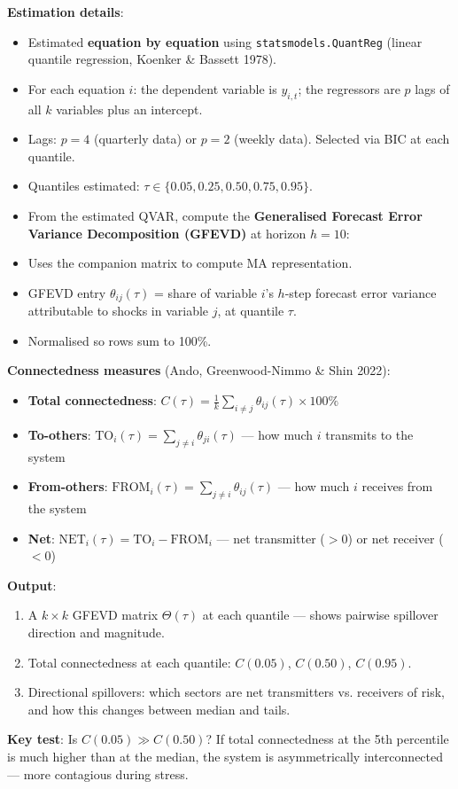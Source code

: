 \documentclass[11pt,a4paper]{article}
\begin{document}
\textbf{Estimation details}:
\begin{itemize}
\item Estimated \textbf{equation by equation} using \texttt{statsmodels.QuantReg} (linear quantile regression, Koenker \& Bassett 1978).
\item For each equation $i$: the dependent variable is $y_{i,t}$; the regressors are $p$ lags of all $k$ variables plus an intercept.
\item Lags: $p = 4$ (quarterly data) or $p = 2$ (weekly data). Selected via BIC at each quantile.
\item Quantiles estimated: $\tau \in \{0.05, 0.25, 0.50, 0.75, 0.95\}$.
\item From the estimated QVAR, compute the \textbf{Generalised Forecast Error Variance Decomposition (GFEVD)} at horizon $h = 10$:
\item Uses the companion matrix to compute MA representation.
\item GFEVD entry $\theta_{ij}(\tau)$ = share of variable $i$'s $h$-step forecast error variance attributable to shocks in variable $j$, at quantile $\tau$.
\item Normalised so rows sum to 100\%.

\end{itemize}
\textbf{Connectedness measures} (Ando, Greenwood-Nimmo \& Shin 2022):
\begin{itemize}
\item \textbf{Total connectedness}: $C(\tau) = \frac{1}{k} \sum_{i \neq j} \theta_{ij}(\tau) \times 100\%$
\item \textbf{To-others}: $\text{TO}_i(\tau) = \sum_{j \neq i} \theta_{ji}(\tau)$ --- how much $i$ transmits to the system
\item \textbf{From-others}: $\text{FROM}_i(\tau) = \sum_{j \neq i} \theta_{ij}(\tau)$ --- how much $i$ receives from the system
\item \textbf{Net}: $\text{NET}_i(\tau) = \text{TO}_i - \text{FROM}_i$ --- net transmitter ($>0$) or net receiver ($<0$)

\end{itemize}
\textbf{Output}:
\begin{enumerate}
\item A $k \times k$ GFEVD matrix $\Theta(\tau)$ at each quantile --- shows pairwise spillover direction and magnitude.
\item Total connectedness at each quantile: $C(0.05)$, $C(0.50)$, $C(0.95)$.
\item Directional spillovers: which sectors are net transmitters vs. receivers of risk, and how this changes between median and tails.

\end{enumerate}
\textbf{Key test}: Is $C(0.05) \gg C(0.50)$? If total connectedness at the 5th percentile is much higher than at the median, the system is asymmetrically interconnected --- more contagious during stress.
\end{document}
